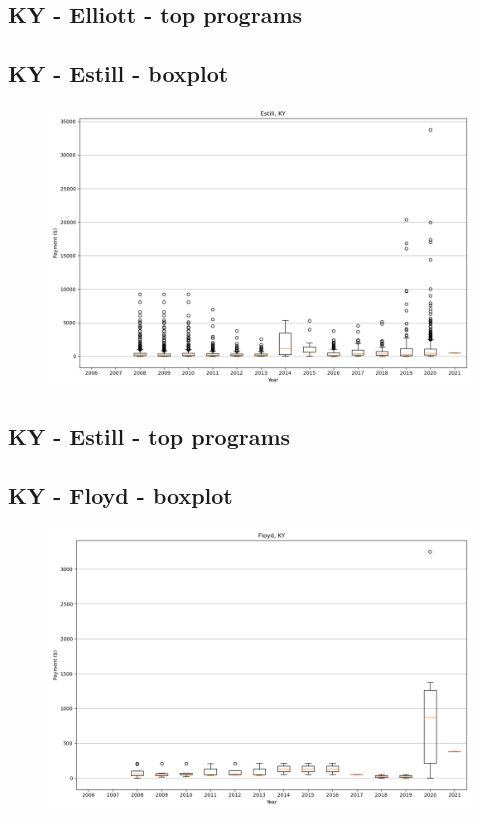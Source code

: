 \subsection*{KY - Elliott - top programs}

\newpage
\subsection*{KY - Estill - boxplot}
\begin{figure}[h]
\centering
\includegraphics[width=7in]{../output/boxplots/counties/Estill-KY_boxplot.png}
\end{figure}


\subsection*{KY - Estill - top programs}

\newpage
\subsection*{KY - Floyd - boxplot}
\begin{figure}[h]
\centering
\includegraphics[width=7in]{../output/boxplots/counties/Floyd-KY_boxplot.png}
\end{figure}


